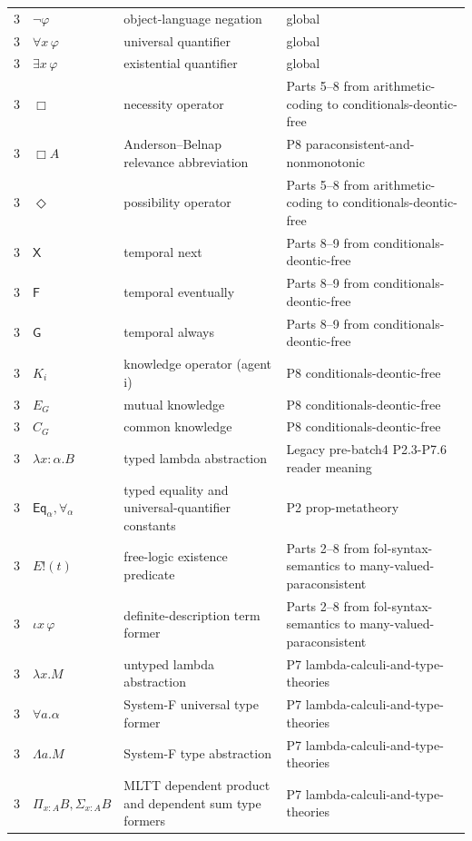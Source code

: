 \begin{longtable}{@{}p{}p{}p{}p{}@{}}
3 & \(\neg\varphi\) & object-language negation & global \\
3 & \(\forall x\,\varphi\) & universal quantifier & global \\
3 & \(\exists x\,\varphi\) & existential quantifier & global \\
3 & \(\Box\) & necessity operator & Parts 5–8 from arithmetic-coding to conditionals-deontic-free \\
3 & \(\Box A\) & Anderson--Belnap relevance abbreviation & P8 paraconsistent-and-nonmonotonic \\
3 & \(\Diamond\) & possibility operator & Parts 5–8 from arithmetic-coding to conditionals-deontic-free \\
3 & \(\mathsf X\) & temporal next & Parts 8–9 from conditionals-deontic-free \\
3 & \(\mathsf F\) & temporal eventually & Parts 8–9 from conditionals-deontic-free \\
3 & \(\mathsf G\) & temporal always & Parts 8–9 from conditionals-deontic-free \\
3 & \(K_i\) & knowledge operator (agent i) & P8 conditionals-deontic-free \\
3 & \(E_G\) & mutual knowledge & P8 conditionals-deontic-free \\
3 & \(C_G\) & common knowledge & P8 conditionals-deontic-free \\
3 & \(\lambda x{:}\alpha.B\) & typed lambda abstraction & Legacy pre-batch4 P2.3-P7.6 reader meaning \\
3 & \(\mathsf{Eq}_{\alpha},\forall_{\alpha}\) & typed equality and universal-quantifier constants & P2 prop-metatheory \\
3 & \(E!(t)\) & free-logic existence predicate & Parts 2–8 from fol-syntax-semantics to many-valued-paraconsistent \\
3 & \(\iota x\,\varphi\) & definite-description term former & Parts 2–8 from fol-syntax-semantics to many-valued-paraconsistent \\
3 & \(\lambda x.M\) & untyped lambda abstraction & P7 lambda-calculi-and-type-theories \\
3 & \(\forall a.\alpha\) & System-F universal type former & P7 lambda-calculi-and-type-theories \\
3 & \(\Lambda a.M\) & System-F type abstraction & P7 lambda-calculi-and-type-theories \\
3 & \(\Pi_{x:A}B,\Sigma_{x:A}B\) & MLTT dependent product and dependent sum type formers & P7 lambda-calculi-and-type-theories \\

\end{longtable}
